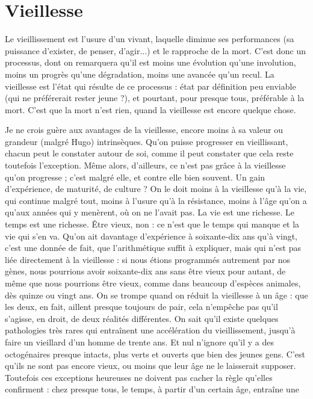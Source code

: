 \section{Vieillesse}
Le vieillissement est l’usure d’un vivant, laquelle diminue ses
performances (sa puissance d’exister, de penser, d’agir...) et le
rapproche de la mort. C’est donc un processus, dont on remarquera qu'il est
moins une évolution qu’une involution, moins un progrès qu’une dégradation,
moins une avancée qu'un recul. La vieillesse est l’état qui résulte de ce
processus : état par définition peu enviable (qui ne préférerait rester jeune ?), et
pourtant, pour presque tous, préférable à la mort. C’est que la mort n'est rien,
quand la vieillesse est encore quelque chose.

Je ne crois guère aux avantages de la vieillesse, encore moins à sa valeur ou
grandeur (malgré Hugo) intrinsèques. Qu’on puisse progresser en vieillissant,
chacun peut le constater autour de soi, comme il peut constater que cela reste
toutefois l’exception. Même alors, d’ailleurs, ce n’est pas grâce à la vieillesse
qu’on progresse ; c’est malgré elle, et contre elle bien souvent. Un gain d’expérience,
de maturité, de culture ? On le doit moins à la vieillesse qu’à la vie, qui
continue malgré tout, moins à l’usure qu’à la résistance, moins à l’âge qu'on a
qu'aux années qui y menèrent, où on ne l’avait pas. La vie est une richesse. Le
temps est une richesse. Être vieux, non : ce n’est que le temps qui manque et la
vie qui s’en va. Qu'on ait davantage d’expérience à soixante-dix ans qu'à vingt,
c'est une donnée de fait, que l’arithmétique suffit à expliquer, mais qui n’est
pas liée directement à la vieillesse : si nous étions programmés autrement par
nos gènes, nous pourrions avoir soixante-dix ans sans être vieux pour autant, de
même que nous pourrions être vieux, comme dans beaucoup d'espèces animales,
dès quinze ou vingt ans. On se trompe quand on réduit la vieillesse à un
âge : que les deux, en fait, aillent presque toujours de pair, cela n’empêche pas
qu’il s’agisse, en droit, de deux réalités différentes. On sait qu’il existe quelques
pathologies très rares qui entraînent une accélération du vieillissement, jusqu’à
faire un vieillard d’un homme de trente ans. Et nul n’ignore qu’il y a des octogénaires
presque intacts, plus verts et ouverts que bien des jeunes gens. C'est
qu’ils ne sont pas encore vieux, ou moins que leur âge ne le laisserait supposer.
Toutefois ces exceptions heureuses ne doivent pas cacher la règle qu’elles
confirment : chez presque tous, le temps, à partir d’un certain âge, entraîne une

